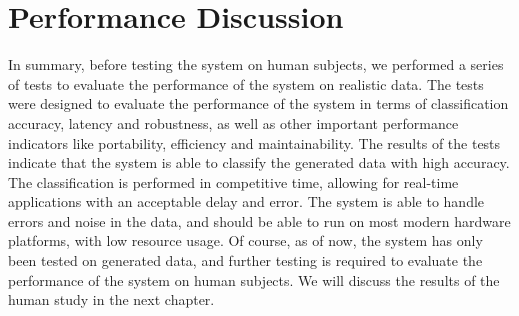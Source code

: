 \section{Performance Discussion}
In summary, before testing the system on human subjects, we performed a series of tests to evaluate the performance of the system on realistic data.
The tests were designed to evaluate the performance of the system in terms of classification accuracy, latency and robustness, as well as other important performance indicators like portability, efficiency and maintainability.
The results of the tests indicate that the system is able to classify the generated data with high accuracy.
The classification is performed in competitive time, allowing for real-time applications with an acceptable delay and error.
The system is able to handle errors and noise in the data, and should be able to run on most modern hardware platforms, with low resource usage.
Of course, as of now, the system has only been tested on generated data, and further testing is required to evaluate the performance of the system on human subjects.
We will discuss the results of the human study in the next chapter.
